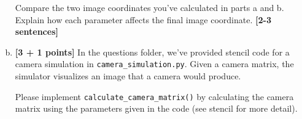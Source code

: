 \begin{enumerate}[(a)]
\begin{tcolorbox}[colback=orange!5!white,colframe=orange!75!black]
Compare the two image coordinates you've calculated in parts a and b. Explain how each parameter affects the final image coordinate. \textbf{[2-3 sentences]}
\end{tcolorbox}











\item \textbf{[3 + 1 points]}
In the questions folder, we've provided stencil code for a camera simulation in \texttt{camera\_simulation.py}. Given a camera matrix, the simulator visualizes an image that a camera would produce. 

\begin{tcolorbox}[colback=orange!5!white,colframe=orange!75!black]
Please implement \texttt{calculate\_camera\_matrix()} by calculating the camera matrix using the parameters given in the code (see stencil for more detail). 
\end{tcolorbox}


\end{enumerate}
